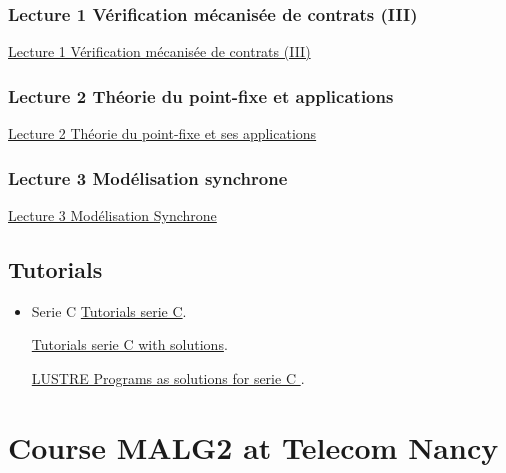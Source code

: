 \documentclass[ 12pt]{article}
\begin{document}
   \subsubsection{Lecture 1 {Vérification  mécanisée de contrats} (III)}

   \href{http://mery54.github.io/teaching/movex/lecturesnotes/movexlecture7.pdf}{Lecture
     1  Vérification  mécanisée de contrats (III)}

   
   \subsubsection{Lecture 2 {Théorie du point-fixe et applications}}

   \href{http://mery54.github.io/teaching/movex/lecturesnotes/movexlecture8.pdf}{Lecture
     2  Théorie du point-fixe et ses applications}

   
   \subsubsection{Lecture 3 {Modélisation synchrone}}

   \href{http://mery54.github.io/teaching/movex/lecturesnotes/movexlecture9.pdf}{Lecture
     3  Modélisation Synchrone}
   


\subsection{Tutorials}



\begin{itemize}
  
  \item[]   Serie  C
    \href{http://mery54.github.io/teaching/movex/lecturesnotes/movexserieC.pdf}{Tutorials 
      serie C}.

          \href{http://mery54.github.io/teaching/movex/lecturesnotes/correctionmovexserieC.pdf}{Tutorials 
      serie C with solutions}. 

    
        \href{http://mery54.github.io/teaching/movex/models/serieC.zip}{LUSTRE
          Programs as  solutions for serie C }.

    \end{itemize}

      
\section{Course MALG2 at Telecom Nancy}
\label{sec:course-mcfsi-at}
\end{document}
